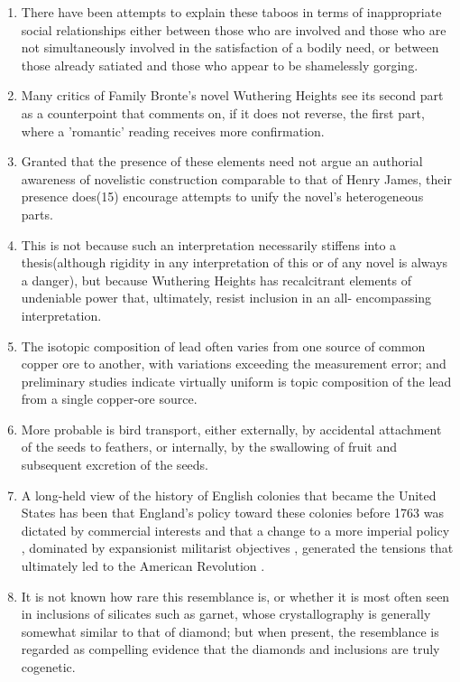 \begin{enumerate}
\item There have been attempts to explain these taboos in terms of                                      
inappropriate social  relationships either between those who are involved and those who are not simultaneously involved in the satisfaction of a bodily need, or between those already satiated and  those who appear to be shamelessly gorging.

\item Many critics of Family Bronte's novel Wuthering Heights see its second  part as a counterpoint that comments on, if it does not reverse, the first part, where a 'romantic' reading receives more confirmation.

\item Granted that the presence of these elements need not argue an                         
authorial awareness of novelistic construction comparable to that of Henry James,  their presence does(15) encourage attempts to unify the novel's heterogeneous parts. 

\item This is not because such an interpretation necessarily stiffens into a
thesis(although rigidity in any interpretation of this or of any novel is always a danger), but because Wuthering Heights has recalcitrant elements of undeniable power that, ultimately, resist inclusion in an all- encompassing interpretation. 

\item The isotopic composition of lead often varies from one source of common                          
copper ore to another, with variations exceeding the measurement error; and preliminary studies indicate  virtually uniform is topic composition of the lead from a single copper-ore source. 

\item More probable is bird transport, either externally, by accidental
attachment of the seeds to feathers, or internally, by the swallowing of fruit and subsequent excretion of the seeds. 

\item A long-held view of the history of English colonies that became the United
States has been that England's policy toward these colonies before 1763 was dictated by commercial interests and that a change to a more imperial policy , dominated by expansionist militarist objectives , generated the tensions that ultimately led to the American Revolution .

\item It is not known how rare this resemblance is, or whether it is most often seen in inclusions of silicates such as garnet, whose crystallography is generally somewhat similar to that of diamond;  but when present,  the resemblance is regarded as compelling evidence that the diamonds and inclusions are truly cogenetic. 


\end{enumerate}
